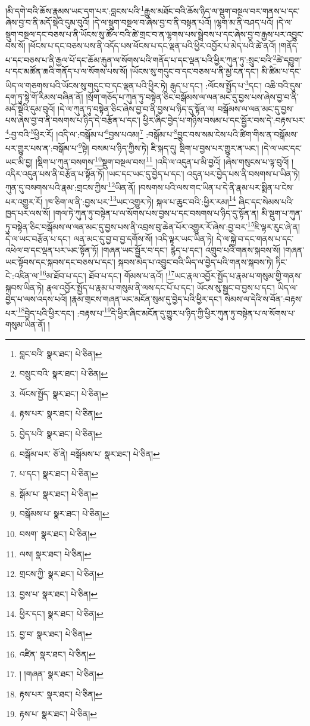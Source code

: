 །མི་དགེ་བའི་ཆོས་རྣམས་ཡང་དག་པར་:བླངས་པའི་\footnote{བླང་བའི་  སྣར་ཐང་།  པེ་ཅིན། }རྒྱུས་མཐོང་བའི་ཆོས་ཉིད་ལ་སྡུག་བསྔལ་བར་གནས་པ་དང་ཞེས་བྱ་བ་ནི་མདོ་སྡེའི་དུམ་བུའོ། །དེ་ལ་སྡུག་བསྔལ་བ་ཞེས་བྱ་བ་ནི་བསྟན་པའོ། །ལྷག་མ་ནི་བཤད་པའོ། །དེ་ལ་སྡུག་བསྔལ་དང་བཅས་པ་ནི་ཡོངས་སུ་ཚོལ་བའི་ཚེ་གྲང་བ་ན་ལྷགས་པས་སྦྲེབས་པ་དང་ཞེས་བྱ་བ་རྒྱས་པར་འབྱུང་བས་སོ། །ཕོངས་པ་དང་བཅས་པས་ནི་འདོད་པས་ཕོངས་པ་དང་ལྡན་པའི་ཕྱིར་འབྱོར་པ་མེད་པའི་ཚེ་ནའོ། །གནོད་པ་དང་བཅས་པ་ནི་རྒྱལ་པོ་དང་ཆོམ་རྐུན་ལ་སོགས་པའི་གནོད་པ་དང་ལྡན་པའི་ཕྱིར་ཀུན་ཏུ་:སྲུང་བའི་\footnote{བསྲུང་བའི་  སྣར་ཐང་།  པེ་ཅིན། }ཚེ་དབྱུག་པ་དང་མཚོན་ཆའི་གནོད་པ་ལ་སོགས་པས་སོ། །ཡོངས་སུ་གདུང་བ་དང་བཅས་པ་ནི་མྱ་ངན་དང་། མི་ཚིམ་པ་དང་ཡིད་ལ་གཅགས་པའི་ཡོངས་སུ་གདུང་བ་དང་ལྡན་པའི་ཕྱིར་ཏེ། རྒུད་པ་དང་། :ལོངས་སྤྱོད་པ་\footnote{ལོངས་སྤྱོད་  སྣར་ཐང་།  པེ་ཅིན། }དང་། འཆི་བའི་དུས་དག་ཏུ་སྟེ་གོ་རིམས་བཞིན་ནོ། །སྲོག་གཅོད་པ་ཀུན་ཏུ་བསྟེན་ཅིང་བསྒོམས་ལ་ལན་མང་དུ་བྱས་པས་ཞེས་བྱ་བ་ནི་མདོ་སྡེའི་དུམ་བུའོ། །དེ་ལ་ཀུན་ཏུ་བསྟེན་ཅིང་ཞེས་བྱ་བ་ནི་བྱས་པ་ཉིད་དུ་སྟོན་ལ། བསྒོམས་ལ་ལན་མང་དུ་བྱས་པས་ཞེས་བྱ་བ་ནི་བསགས་པ་ཉིད་དེ་བརྩོན་པ་དང་། ཕྱིར་ཞིང་བྱེད་པ་གཉིས་བསམ་པ་དང་སྦྱོར་བས་དེ་:བརྟས་པར་\footnote{རྟས་པར་  སྣར་ཐང་།  པེ་ཅིན། }:བྱ་བའི་\footnote{བྱེད་པའི་  སྣར་ཐང་།  པེ་ཅིན། }ཕྱིར་རོ། །འདི་ལ་:བསྒོམ་པ་\footnote{བསྒོམ་པར་  ཅོ་ནེ། བསྒོམས་པ་  སྣར་ཐང་།  པེ་ཅིན། }བྱས་པའམ།\footnote{པ་དང་།  སྣར་ཐང་།  པེ་ཅིན། } :བསྒོམ་པ་\footnote{སྒོམ་པ་  སྣར་ཐང་།  པེ་ཅིན། }བྱུང་བས་སམ་ངེས་པའི་ཚིག་གིས་ན་བསྒོམས་པར་གྱུར་པས་ན་:བསྒོམ་པ་\footnote{བསྒོམས་པ་  སྣར་ཐང་།  པེ་ཅིན། }སྟེ། བསམ་པ་ཉིད་ཀྱིས་ཏེ། ཇི་སྐད་དུ། སྡིག་པ་བྱས་པར་གྱུར་ན་ཡང་། །དེ་ལ་ཡང་དང་ཡང་མི་བྱ། །སྡིག་པ་ཀུན་བསགས་\footnote{བསག་  སྣར་ཐང་།  པེ་ཅིན། }སྡུག་བསྔལ་བས།\footnote{ལས།  སྣར་ཐང་།  པེ་ཅིན། } །འདི་ལ་འདུན་པ་མི་བྱའོ། །ཞེས་གསུངས་པ་ལྟ་བུའོ། །འདིར་འདུན་པས་ནི་བརྩོན་པ་སྟོན་ཏོ། །ཡང་དང་ཡང་དུ་བྱེད་པ་དང་། འདུན་པར་བྱེད་པས་ནི་བསགས་པ་ཡིན་ཏེ། ཀུན་དུ་བསགས་པའི་རྣམ་:གྲངས་ཀྱིས་\footnote{གྲངས་ཀྱི་  སྣར་ཐང་།  པེ་ཅིན། }ཡིན་ནོ། །བསགས་པའི་ལས་གང་ཡིན་པ་དེ་ནི་རྣམ་པར་སྨིན་པ་ངེས་པར་འགྱུར་རོ། །ཁ་ཅིག་ལ་ནི་:བྱས་པར་\footnote{བྱས་པ་  སྣར་ཐང་།  པེ་ཅིན། }ཡང་འགྱུར་ཏེ། སྐལ་པ་ཆུང་བའི་:ཕྱིར་རམ།\footnote{ཕྱིར་དང་།  སྣར་ཐང་།  པེ་ཅིན། } ཞིང་དང་སེམས་པའི་ཁྱད་པར་ལས་སོ། །གལ་ཏེ་ཀུན་ཏུ་བསྟེན་པ་ལ་སོགས་པས་བྱས་པ་དང་བསགས་པ་ཉིད་དུ་སྟོན་ན། མི་སྡུག་པ་ཀུན་ཏུ་བསྟེན་ཅིང་བསྒོམས་ལ་ལན་མང་དུ་བྱས་པས་ནི་འབྲས་བུ་ཆེན་པོར་འགྱུར་རོ་ཞེས་:བྱ་བར་\footnote{བྱ་བ་  སྣར་ཐང་།  པེ་ཅིན། }ཇི་ལྟར་རུང་ཞེ་ན། དེ་ལ་ཡང་བརྩོན་པ་དང་། ལན་མང་དུ་བྱ་བ་བྱ་དགོས་སོ། །འདི་ལྟར་ཡང་ཡིན་ཏེ། དེ་ལ་སྐྱེ་བ་དང་གནས་པ་དང་འཕེལ་བ་དང་ལྡན་པར་ཡང་སྟོན་ཏོ། །གཞན་ཡང་སྦྱོར་བ་དང་། རྙེད་པ་དང་། འགྲུབ་པའི་གནས་སྐབས་སོ། །གཞན་ཡང་སྟོབས་དང་སྐབས་དང་བཅས་པ་དང་། སྐབས་མེད་པ་འབྱུང་བའི་ཡིད་ལ་བྱེད་པའི་གནས་སྐབས་ཏེ། ཏིང་ངེ་:འཛིན་ལ་\footnote{འཛིན་  སྣར་ཐང་།  པེ་ཅིན། }མ་ཐོབ་པ་དང་། ཐོབ་པ་དང་། གོམས་པ་ནའོ། །\footnote{། །གཞན་  སྣར་ཐང་།  པེ་ཅིན། }ཡང་རྣལ་འབྱོར་སྤྱོད་པ་རྣམ་པ་གསུམ་གྱི་གནས་སྐབས་ཡིན་ཏེ། རྣལ་འབྱོར་སྤྱོད་པ་རྣམ་པ་གསུམ་ནི་ལས་དང་པོ་པ་དང་། ཡོངས་སུ་སྦྱང་བ་བྱས་པ་དང་། ཡིད་ལ་བྱེད་པ་ལས་འདས་པའོ། །རྣམ་གྲངས་གཞན་ཡང་མངོན་སུམ་དུ་བྱེད་པའི་ཕྱིར་དང་། སེམས་ལ་དེའི་ས་བོན་:བརྟས་པར་\footnote{རྟས་པར་  སྣར་ཐང་།  པེ་ཅིན། }བྱེད་པའི་ཕྱིར་དང་། :བརྟས་པ་\footnote{རྟས་པ་  སྣར་ཐང་།  པེ་ཅིན། }དེ་ཕྱིར་ཞིང་མངོན་དུ་གྱུར་པ་ཉིད་ཀྱི་ཕྱིར་ཀུན་ཏུ་བསྟེན་པ་ལ་སོགས་པ་གསུམ་ཡིན་ནོ། །

